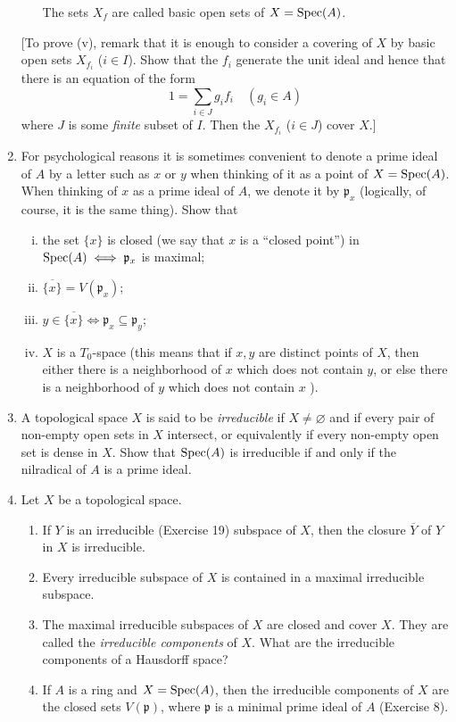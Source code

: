 \documentclass[class=book, crop=false]{standalone}
\theoremstyle{definition}
\theoremstyle{remark}
\begin{document}
\begin{enumerate}[resume*=exc1]
\begin{enumerate}[i)]
The sets $X_{f}$ are called basic open sets of $X=\operatorname{Spec}(A)$.
\end{enumerate}
[To prove (v), remark that it is enough to consider a covering of $X$ by basic
open sets $X_{f_{i}}$ ($i \in I$). Show that the $f_{i}$ generate the unit ideal
and hence that there is an equation of the form
\[
  1=\sum_{i \in J} g_{i} f_{i} \quad\left(g_{i} \in A\right)
\]
where $J$ is some \textit{finite} subset of $I$. Then the $X_{f_{i}}$ ($i \in J$) cover
$X$.]

\item For psychological reasons it is sometimes convenient to denote a prime
ideal of $A$ by a letter such as $x$ or $y$ when thinking of it as a point of
$X=\operatorname{Spec}(A)$. When thinking of $x$ as a prime ideal of $A$, we
denote it by $\mathfrak{p}_{x}$ (logically, of course, it is the same thing).
Show that
\begin{enumerate}[i)]
  \item the set $\{x\}$ is closed (we say that $x$ is a ``closed point'') in
$\operatorname{Spec}(A) \iff \mathfrak{p}_{x}$ is maximal;
  \item $\overline{\{x\}}=V\left(\mathfrak{p}_{x}\right)$;
  \item $y \in \overline{\{x\}} \iff \mathfrak{p}_{x} \subseteq \mathfrak{p}_{y}$;
  \item $X$ is a $T_{0}$-space (this means that if $x, y$ are distinct points of
$X$, then either there is a neighborhood of $x$ which does not contain $y$, or
else there is a neighborhood of $y$ which does not contain $x$ ).
\end{enumerate}
  \item A topological space $X$ is said to be \textit{irreducible} if
        $X \neq \varnothing$ and if every pair of non-empty open sets in $X$
        intersect, or equivalently if every non-empty open set is dense in $X$.
        Show that $\operatorname{Spec}(A)$ is irreducible if and only if the
        nilradical of $A$ is a prime ideal.

  \item Let $X$ be a topological space.
\begin{enumerate}
  \item If $Y$ is an irreducible (Exercise 19) subspace of $X$, then the closure
$\overline{Y}$ of $Y$ in $X$ is irreducible.
  \item Every irreducible subspace of $X$ is contained in a maximal irreducible
subspace.
  \item The maximal irreducible subspaces of $X$ are closed and cover $X$. They are
called the \textit{irreducible components} of $X$. What are the irreducible components of
a Hausdorff space?
  \item If $A$ is a ring and $X=\operatorname{Spec}(A)$, then the irreducible
components of $X$ are the closed sets $V(\mathfrak{p})$, where $\mathfrak{p}$ is
a minimal prime ideal of $A$ (Exercise 8).
\end{enumerate}


\end{enumerate}
\end{document}
